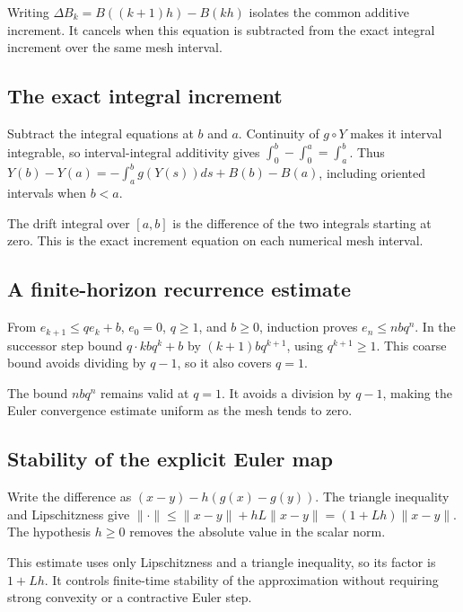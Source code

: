 \documentclass[11pt,a4paper]{article}
\begin{document}
Writing \(\Delta B_k=B((k+1)h)-B(kh)\) isolates the common additive increment. It cancels when this equation is subtracted from the exact integral increment over the same mesh interval.


\subsection{\texorpdfstring{The exact integral increment}{The exact integral increment}}


Subtract the integral equations at \(b\) and \(a\). Continuity of \(g\circ Y\) makes it interval integrable, so interval-integral additivity gives \(\int_0^b-\int_0^a=\int_a^b\). Thus \(Y(b)-Y(a)=-\int_a^b g(Y(s))ds+B(b)-B(a)\), including oriented intervals when \(b<a\).



The drift integral over \([a,b]\) is the difference of the two integrals starting at zero. This is the exact increment equation on each numerical mesh interval.


\subsection{\texorpdfstring{A finite-horizon recurrence estimate}{A finite-horizon recurrence estimate}}


From \(e_{k+1}\le qe_k+b\), \(e_0=0\), \(q\ge1\), and \(b\ge0\), induction proves \(e_n\le nbq^n\). In the successor step bound \(q\cdot kbq^k+b\) by \((k+1)bq^{k+1}\), using \(q^{k+1}\ge1\). This coarse bound avoids dividing by \(q-1\), so it also covers \(q=1\).



The bound \(nbq^n\) remains valid at \(q=1\). It avoids a division by \(q-1\), making the Euler convergence estimate uniform as the mesh tends to zero.


\subsection{\texorpdfstring{Stability of the explicit Euler map}{Stability of the explicit Euler map}}


Write the difference as \((x-y)-h(g(x)-g(y))\). The triangle inequality and Lipschitzness give \(\|\cdot\|\le\|x-y\|+hL\|x-y\|=(1+Lh)\|x-y\|\). The hypothesis \(h\ge0\) removes the absolute value in the scalar norm.



This estimate uses only Lipschitzness and a triangle inequality, so its factor is \(1+Lh\). It controls finite-time stability of the approximation without requiring strong convexity or a contractive Euler step.
\end{document}

